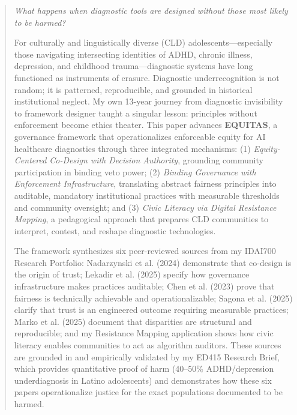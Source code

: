 \documentclass[12pt,a4paper]{article}
\begin{document}
\clearpage

\begin{abstract}

\textit{What happens when diagnostic tools are designed without those most likely to be harmed?}

For culturally and linguistically diverse (CLD) adolescents—especially those navigating intersecting identities of ADHD, chronic illness, depression, and childhood trauma—diagnostic systems have long functioned as instruments of erasure. Diagnostic underrecognition is not random; it is patterned, reproducible, and grounded in historical institutional neglect. My own 13-year journey from diagnostic invisibility to framework designer taught a singular lesson: principles without enforcement become ethics theater. This paper advances \textbf{EQUITAS}, a governance framework that operationalizes enforceable equity for AI healthcare diagnostics through three integrated mechanisms: (1) \textit{Equity-Centered Co-Design with Decision Authority}, grounding community participation in binding veto power; (2) \textit{Binding Governance with Enforcement Infrastructure}, translating abstract fairness principles into auditable, mandatory institutional practices with measurable thresholds and community oversight; and (3) \textit{Civic Literacy via Digital Resistance Mapping}, a pedagogical approach that prepares CLD communities to interpret, contest, and reshape diagnostic technologies.

\vspace{0.5em}

The framework synthesizes six peer-reviewed sources from my IDAI700 Research Portfolio: Nadarzynski et al. (2024) demonstrate that co-design is the origin of trust; Lekadir et al. (2025) specify how governance infrastructure makes practices auditable; Chen et al. (2023) prove that fairness is technically achievable and operationalizable; Sagona et al. (2025) clarify that trust is an engineered outcome requiring measurable practices; Marko et al. (2025) document that disparities are structural and reproducible; and my Resistance Mapping application shows how civic literacy enables communities to act as algorithm auditors. These sources are grounded in and empirically validated by my ED415 Research Brief, which provides quantitative proof of harm (40--50\% ADHD/depression underdiagnosis in Latino adolescents) and demonstrates how these six papers operationalize justice for the exact populations documented to be harmed.


\end{abstract}
\end{document}
